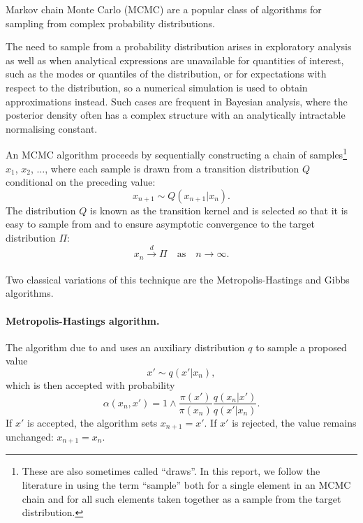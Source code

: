 \documentclass[11pt,a4paper]{report}
\begin{document}
Markov chain Monte Carlo (MCMC) are a popular class of algorithms for sampling from complex probability distributions.

The need to sample from a probability distribution arises in exploratory analysis as well as when analytical expressions are unavailable for quantities of interest, such as the modes or quantiles of the distribution, or for expectations with respect to the distribution, so a numerical simulation is used to obtain approximations instead. Such cases are frequent in Bayesian analysis, where the posterior density often has a complex structure with an analytically intractable normalising constant.


An MCMC algorithm proceeds by sequentially constructing a chain of samples\footnote{These are also sometimes called ``draws''. In this report, we follow the literature in using the term ``sample'' both for a single element in an MCMC chain and for all such elements taken together as a sample from the target distribution.} $x_1$, $x_2$, $\dots$,  where each sample is drawn from a transition distribution $Q$ conditional on the preceding value:
$$x_{n+1} \sim Q(x_{n+1}|x_n).$$
The distribution $Q$ is known as the transition kernel and is selected so that it is easy to sample from and to ensure asymptotic convergence to the target distribution $\Pi$:
$$x_n \xrightarrow[]{d} \Pi \quad\text{as}\quad n \to \infty.$$

Two classical variations of this technique are the Metropolis-Hastings and Gibbs algorithms.

\paragraph{Metropolis-Hastings algorithm.} The algorithm due to \cite{metropolisEquationStateCalculations1953} and \cite{hastingsMonteCarloSampling1970} uses an auxiliary distribution $q$ to sample a proposed value
$$x' \sim q(x' | x_n),$$
which is then accepted with probability
$$\alpha(x_n, x') = 1 \wedge \frac{\pi(x')}{\pi(x_n)} \frac{q(x_n|x')}{q(x'|x_n)}.$$
If $x'$ is accepted, the algorithm sets $x_{n+1} = x'$. If $x'$ is rejected, the value remains unchanged: $x_{n+1} = x_n$.

\end{document}
